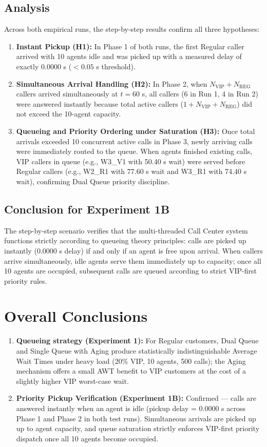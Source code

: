 \documentclass[11pt]{article}
\begin{document}
\subsection{Analysis}
Across both empirical runs, the step-by-step results confirm all three hypotheses:
\begin{enumerate}[leftmargin=1.5em]
    \item \textbf{Instant Pickup (H1):} In Phase 1 of both runs, the first Regular caller arrived with 10 agents idle and was picked up with a measured delay of exactly $0.0000$ s ($< 0.05$ s threshold).
    \item \textbf{Simultaneous Arrival Handling (H2):} In Phase 2, when $N_{\text{VIP}} + N_{\text{REG}}$ callers arrived simultaneously at $t=60$ s, all callers (6 in Run 1, 4 in Run 2) were answered instantly because total active callers ($1 + N_{\text{VIP}} + N_{\text{REG}}$) did not exceed the 10-agent capacity.
    \item \textbf{Queueing and Priority Ordering under Saturation (H3):} Once total arrivals exceeded 10 concurrent active calls in Phase 3, newly arriving calls were immediately routed to the queue. When agents finished existing calls, VIP callers in queue (e.g., W3\_V1 with 50.40 s wait) were served before Regular callers (e.g., W2\_R1 with 77.60 s wait and W3\_R1 with 74.40 s wait), confirming Dual Queue priority discipline.
\end{enumerate}

\subsection{Conclusion for Experiment 1B}
The step-by-step scenario verifies that the multi-threaded Call Center system functions strictly according to queueing theory principles: calls are picked up instantly ($0.0000$ s delay) if and only if an agent is free upon arrival. When callers arrive simultaneously, idle agents serve them immediately up to capacity; once all 10 agents are occupied, subsequent calls are queued according to strict VIP-first priority rules.

\section{Overall Conclusions}
\begin{enumerate}
    \item \textbf{Queueing strategy (Experiment 1):} For Regular customers, Dual Queue and Single Queue with Aging produce statistically indistinguishable Average Wait Times under heavy load (20\% VIP, 10 agents, 500 calls); the Aging mechanism offers a small AWT benefit to VIP customers at the cost of a slightly higher VIP worst-case wait.
    \item \textbf{Priority Pickup Verification (Experiment 1B):} Confirmed --- calls are answered instantly when an agent is idle (pickup delay = $0.0000$ s across Phase 1 and Phase 2 in both test runs). Simultaneous arrivals are picked up up to agent capacity, and queue saturation strictly enforces VIP-first priority dispatch once all 10 agents become occupied.
\end{enumerate}
\end{document}
